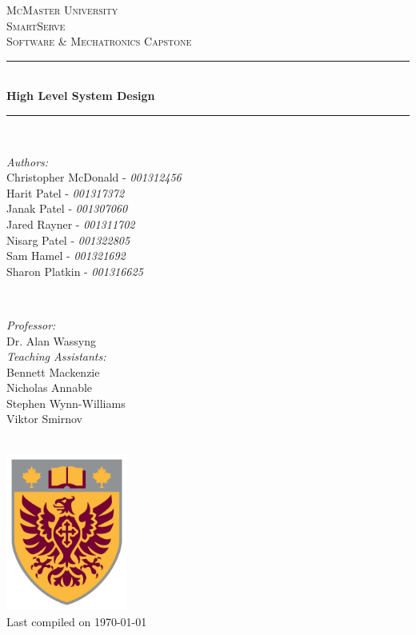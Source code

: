 \documentclass[11pt]{article}
\begin{document}
\begin{titlepage}
	\newcommand{\HRule}{\rule{\linewidth}{0.2mm}}
	\begin{center}
	\textsc{\LARGE McMaster University}\\[1.5cm]

	\textsc{\Large SmartServe}\\[0.5cm]
	\textsc{\large Software \& Mechatronics Capstone}\\[0.5cm]

	\HRule\\[0.4cm]
		{\huge\bfseries High Level System Design}\\[0.4cm]
	\HRule\\[0.4cm]

	\begin{minipage}[t][][t]{0.5\textwidth}
		\begin{flushleft} \large
			\emph{Authors:}\\
			Christopher McDonald - \textit{001312456} \\
			Harit Patel - \textit{001317372}\\
			Janak Patel - \textit{001307060} \\
			Jared Rayner - \textit{001311702}\\
			Nisarg Patel - \textit{001322805} \\
			Sam Hamel - \textit{001321692} \\
			Sharon Platkin - \textit{001316625} \\
		\end{flushleft}
	\end{minipage}
	~
	\begin{minipage}[t][][t]{0.4\textwidth}
		\begin{flushright} \large
			\emph{Professor:} \\
			Dr. Alan Wassyng \\[0.4cm]
			\emph{Teaching Assistants:} \\
			Bennett Mackenzie \\
			Nicholas Annable \\
			Stephen Wynn-Williams \\
			Viktor Smirnov
		\end{flushright}
	\end{minipage}\\[2cm]

	\includegraphics[width=0.3\textwidth]{logo.png} \\
	{\large Last compiled on \today}
	\end{center}

\end{titlepage}
\end{document}
